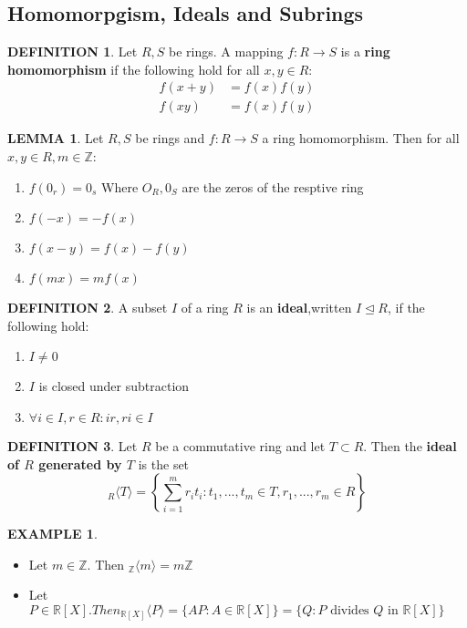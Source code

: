 \documentclass[12pt]{article}
\theoremstyle{definition}
\newtheorem{definition}{DEFINITION}[subsection]
\newtheorem{lemma}{LEMMA}[subsection]
\newtheorem{example}{EXAMPLE}[subsection]
\begin{document}
\subsection{Homomorpgism, Ideals and Subrings}
\begin{definition}
    Let $R,S$ be rings. A mapping $f:R\rightarrow S$ is a \textbf{ring homomorphism} if the following hold for all $x,y \in R$:
    \[\begin{split}
        f(x+y) &= f(x)f(y)\\
        f(xy) &= f(x)f(y)
    \end{split}\]
\end{definition}

\begin{lemma}
    Let $R,S$ be rings and $f:R\rightarrow S$ a ring homomorphism. Then for all $x,y\in R, m\in \mathbb{Z}$:
    \begin{enumerate}
        \item $f(0_r) = 0_s$ Where $O_R,0_S$ are the zeros of the resptive ring
        \item $f(-x) = -f(x)$
        \item $f(x-y) = f(x) - f(y)$
        \item $f(mx) = mf(x)$
    \end{enumerate}
\end{lemma}

\begin{definition}
    A subset $I$ of a ring $R$ is an \textbf{ideal},written $I \trianglelefteq R$, if the following hold:
    \begin{enumerate}
        \item $I \neq 0$
        \item $I$ is closed under subtraction
        \item $\forall i \in I, r\in R: ir,ri\in I$
    \end{enumerate} 
\end{definition}

\begin{definition}
    Let $R$ be a commutative ring and let $T \subset R$. Then the \textbf{ideal of $R$ generated by $T$} is the set
    $$_R\langle T\rangle = \left\{\sum_{i=1}^m{r_it_i}: t_1,...,t_m\in T, r_1,...,r_m \in R\right\}$$
\end{definition}

\begin{example}
    \quad
    \begin{itemize}
        \item Let $m \in \mathbb{Z}$. Then $_\mathbb{Z}\langle m \rangle = m\mathbb{Z}$
        \item Let $P \in \mathbb{R}[X]. Then _{\mathbb{R}[X]}\langle P \rangle = \{AP: A \in \mathbb{R}[X]\} = \{Q:P \text{ divides } Q \text{ in } \mathbb{R}[X]\}$
    \end{itemize}
\end{example}
\end{document}

